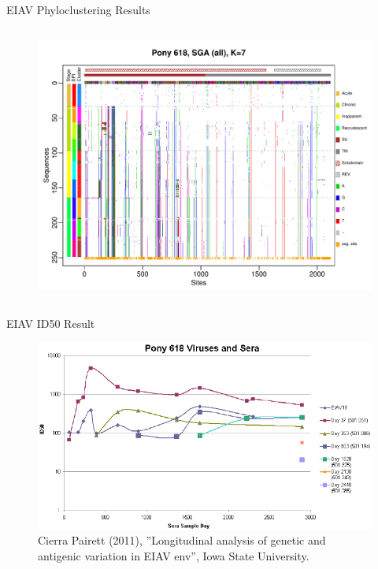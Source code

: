 \documentclass{beamer}
\begin{document}
\begin{frame}{EIAV Phyloclustering Results}

\vspace{-1.0cm}
\begin{columns}

\hspace{-1.0cm}
\begin{column}{\textwidth}
\begin{figure}
  \includegraphics[width=4.6in]{./graph/SGA_sort_all_K=7}
\end{figure}
\end{column}

\end{columns}

\end{frame}


\begin{frame}{EIAV ID50 Result}

\vspace{-0.2cm}
\begin{figure}
  \includegraphics[width=4.5in]{./graph/cierra}
  \\
  \vspace{-0.1cm}
  {\tiny Cierra Pairett (2011), ''Longitudinal analysis of genetic and antigenic
  variation in EIAV env'', Iowa State University.}
\end{figure}

\end{frame}
\end{document}
